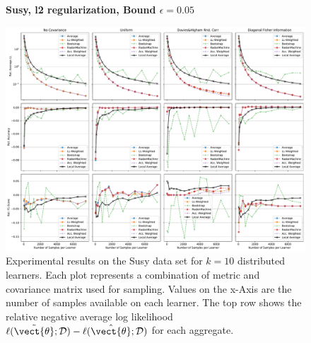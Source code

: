 \begin{landscape}
    \begin{figure}
        \centering
        \textbf{Susy, l2 regularization, Bound $\epsilon=0.05$}\par\medskip
        \includegraphics[height=\dimexpr \textheight - 1\baselineskip\relax]{kapitel/figures/susy_l2_0.05_neg_relative.pdf}
        \caption[Susy plots with l2 regularization and $\epsilon=0.05$]{Experimental results on the Susy data set for $k=10$ distributed learners. Each plot represents a combination of metric and covariance matrix used for sampling. Values on the x-Axis are the number of samples available on each learner. The top row shows the relative negative average log likelihood $\ell(\tilde{\vect{\theta}}; \mathcal{D}) - \ell(\hat{\vect{\theta}}; \mathcal{D})$  for each aggregate.}
        \label{fig:analysis1}
    \end{figure}
    \end{landscape}
